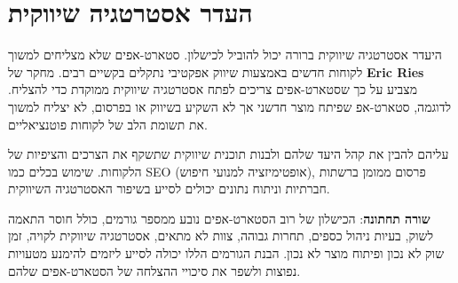 \section{העדר אסטרטגיה שיווקית}

היעדר אסטרטגיה שיווקית ברורה יכול להוביל לכישלון. סטארט-אפים שלא מצליחים למשוך לקוחות חדשים באמצעות שיווק אפקטיבי נתקלים בקשיים רבים. מחקר של \textbf{Eric Ries} מצביע על כך שסטארט-אפים צריכים לפתח אסטרטגיה שיווקית ממוקדת כדי להצליח. לדוגמה, סטארט-אפ שפיתח מוצר חדשני אך לא השקיע בשיווק או בפרסום, לא יצליח למשוך את תשומת הלב של לקוחות פוטנציאליים.

עליהם להבין את קהל היעד שלהם ולבנות תוכנית שיווקית שתשקף את הצרכים והציפיות של הלקוחות. שימוש בכלים כמו SEO (אופטימיזציה למנועי חיפוש), פרסום ממומן ברשתות חברתיות וניתוח נתונים יכולים לסייע בשיפור האסטרטגיה השיווקית.

\begin{takeaway}
\textbf{שורה תחתונה}: הכישלון של רוב הסטארט-אפים נובע ממספר גורמים, כולל חוסר התאמה לשוק, בעיות ניהול כספים, תחרות גבוהה, צוות לא מתאים, אסטרטגיה שיווקית לקויה, זמן שוק לא נכון ופיתוח מוצר לא נכון. הבנת הגורמים הללו יכולה לסייע ליזמים להימנע מטעויות נפוצות ולשפר את סיכויי ההצלחה של הסטארט-אפים שלהם.
\end{takeaway}
